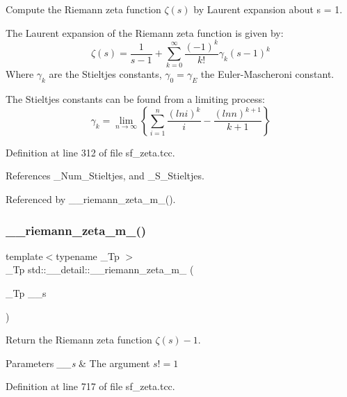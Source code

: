 Compute the Riemann zeta function $ \zeta(s) $ by Laurent expansion about s = 1. 

The Laurent expansion of the Riemann zeta function is given by\+: \[ \zeta(s) = \frac{1}{s-1} + \sum_{k=0}^{\infty} \frac{(-1)^k}{k!}\gamma_k (s-1)^k \] Where $ \gamma_k $ are the Stieltjes constants, $ \gamma_0 = \gamma_E $ the Euler-\/\+Mascheroni constant.

The Stieltjes constants can be found from a limiting process\+: \[ \gamma_k = \lim_{n \to \infty} \left\{ \sum_{i=1}^{n}\frac{(ln i)^k}{i} - \frac{(ln n)^{k+1}}{k+1} \right\} \] 

Definition at line 312 of file sf\+\_\+zeta.\+tcc.



References \+\_\+\+Num\+\_\+\+Stieltjes, and \+\_\+\+S\+\_\+\+Stieltjes.



Referenced by \+\_\+\+\_\+riemann\+\_\+zeta\+\_\+m\+\_().

\mbox{\label{namespacestd_1_1____detail_a174bfa28eeb176b90ff251b5affbecb2}} 
\subsubsection{\texorpdfstring{\+\_\+\+\_\+riemann\+\_\+zeta\+\_\+m\+\_()}{\_\_riemann\_zeta\_m\_1()}}
{\footnotesize\ttfamily template$<$typename \+\_\+\+Tp $>$ \\
\+\_\+\+Tp std\+::\+\_\+\+\_\+detail\+::\+\_\+\+\_\+riemann\+\_\+zeta\+\_\+m\+\_ (\begin{DoxyParamCaption}\item[{\+\_\+\+Tp}]{\+\_\+\+\_\+s }\end{DoxyParamCaption})}



Return the Riemann zeta function $ \zeta(s) - 1 $. 


\begin{DoxyParams}{Parameters}
{\em \+\_\+\+\_\+s} & The argument $ s != 1 $ \\
\hline
\end{DoxyParams}


Definition at line 717 of file sf\+\_\+zeta.\+tcc.



